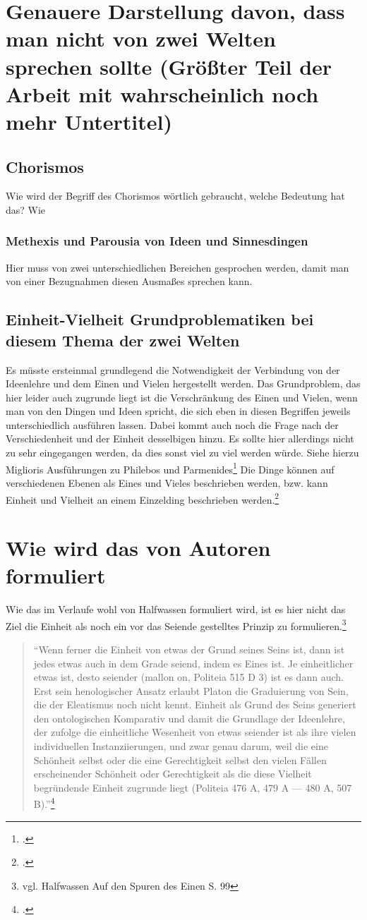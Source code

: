 \documentclass[12pt]{article}
\newcommand*{\zitatblock}[1]{%
    \begin{quote}
    \fontsize{10}{12}\selectfont
    \setlength{\parskip}{1.0em}
    #1
    \end{quote}
}
\begin{document}
\section{Genauere Darstellung davon, dass man nicht von zwei Welten sprechen sollte (Größter Teil der Arbeit mit wahrscheinlich noch mehr Untertitel)}
\subsection{Chorismos}
Wie wird der Begriff des Chorismos wörtlich gebraucht, welche Bedeutung hat das? Wie 


\subsubsection{Methexis und Parousia von Ideen und Sinnesdingen}
Hier muss von zwei unterschiedlichen Bereichen gesprochen werden, damit man von einer Bezugnahmen diesen Ausmaßes sprechen kann. 
\subsection{Einheit-Vielheit Grundproblematiken bei diesem Thema der zwei Welten}
Es müsste ersteinmal grundlegend die Notwendigkeit der Verbindung von der Ideenlehre und dem Einen und Vielen hergestellt werden. 
Das Grundproblem, das hier leider auch zugrunde liegt ist die Verschränkung des Einen und Vielen, wenn man von den Dingen und Ideen spricht, die sich eben in diesen Begriffen jeweils unterschiedlich ausführen lassen. Dabei kommt auch noch die Frage nach der Verschiedenheit und der Einheit desselbigen hinzu.
Es sollte hier allerdings nicht zu sehr eingegangen werden, da dies sonst viel zu viel werden würde.
Siehe hierzu Miglioris Ausführungen zu Philebos und Parmenides\footcite[vgl.][S. 110ff.]{Migliori}
Die Dinge können auf verschiedenen Ebenen als Eines und Vieles beschrieben werden, bzw. kann Einheit und Vielheit an einem Einzelding beschrieben werden.\footcite[vgl.][S. 112]{Migliori}

\section{Wie wird das von Autoren formuliert}
Wie das im Verlaufe wohl von Halfwassen formuliert wird, ist es hier nicht das Ziel die Einheit als noch ein vor das Seiende gestelltes Prinzip zu formulieren.\footnote{vgl. Halfwassen Auf den Spuren des Einen S. 99}
\zitatblock{\enquote{Wenn ferner die Einheit von etwas der Grund seines Seins ist, dann ist jedes etwas auch in dem Grade seiend, indem es Eines ist. Je einheitlicher etwas ist, desto seiender (mallon on, Politeia 515 D 3) ist es dann auch. Erst sein henologischer Ansatz erlaubt Platon die Graduierung von Sein, die der Eleatismus noch nicht kennt. Einheit als Grund des Seins generiert den ontologischen Komparativ und damit die Grundlage der Ideenlehre, der zufolge die einheitliche Wesenheit von etwas seiender ist als ihre vielen individuellen Instanziierungen, und zwar genau darum, weil die eine Schönheit selbst oder die eine Gerechtigkeit selbst den vielen Fällen erscheinender Schönheit oder Gerechtigkeit als die diese Vielheit begründende Einheit zugrunde liegt (Politeia 476 A, 479 A — 480 A, 507 B).}\footcite[][S. 99f.]{halfwassen2015spuren}}
\end{document}

